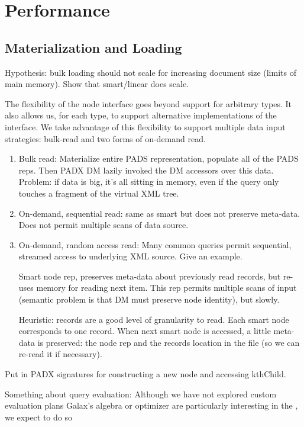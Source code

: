\section{Performance}
\label{section:performance}

\subsection{Materialization and Loading}

Hypothesis: bulk loading should not scale for increasing document size
(limits of main memory).  Show that smart/linear does scale.

The flexibility of the node interface goes beyond support for
arbitrary \pads{} types. It also allows us, for each type, to support
alternative implementations of the interface. We take advantage of
this flexibility to support multiple data input strategies: bulk-read
and two forms of on-demand read.

\begin{enumerate}
\item Bulk read: Materialize entire PADS representation, populate all of the PADS
reps.  Then PADX DM lazily invoked the DM accessors over this data.
Problem: if data is big, it's all sitting in memory, even if the query
only touches a fragment of the virtual XML tree.

\item On-demand, sequential read: same as smart but does not preserve meta-data.
   Does not permit multiple scans of data source. 

\item On-demand, random access read: 
Many common queries permit sequential, streamed access to underlying
XML source.  Give an example.  

Smart node rep, preserves meta-data about previously read records, but
re-uses memory for reading next item.  This rep permits multiple scans
of input (semantic problem is that DM must preserve node identity),
but slowly. 

Heuristic: records are a good level of granularity to read.   Each
smart node corresponds to one record.  When next smart node is
accessed, a little meta-data is preserved: the node rep and the
records location in the file (so we can re-read it if necessary).
\end{enumerate}

Put in PADX signatures for constructing a new node and accessing
kthChild. 

Something about query evaluation:
Although we have not explored custom evaluation plans 
Galax's algebra or optimizer are particularly interesting in the 
\padx{}, we expect to do so 

